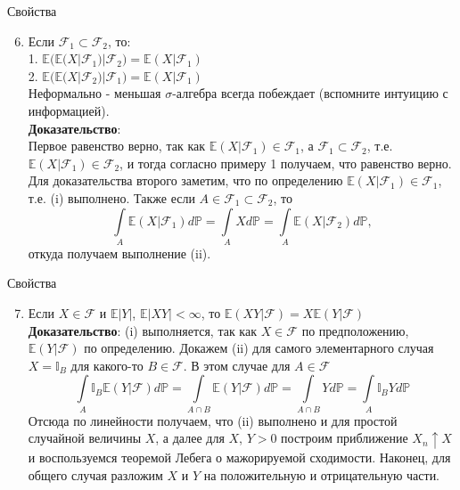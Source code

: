 \documentclass{beamer}%
\theoremstyle{definition}
\renewcommand{\P}{\mathbb{P}}
\newcommand{\F}{\mathcal{F}}
\begin{document}
\begin{frame}{Свойства}

\begin{enumerate}
\setcounter{enumi}{5}
\item Если $\F_1\subset\F_2$, то:
\\
1. $\mathbb{E}\big(\mathbb{E}(X|\F_1)|\F_2\big)=\mathbb{E}(X|\F_1)$
\\
2. $\mathbb{E}\big(\mathbb{E}(X|\F_2)|\F_1\big)=\mathbb{E}(X|\F_1)$
\\
Неформально - меньшая $\sigma$-алгебра всегда побеждает (вспомните интуицию с информацией).
\\
\textbf{Доказательство}:
\\
Первое равенство верно, так как $\mathbb{E}(X|\F_1)\in\F_1$, а $\F_1\subset\F_2$, т.е. $\mathbb{E}(X|\F_1)\in\F_2$, и тогда согласно примеру 1 получаем, что равенство верно.
\\
Для доказательства второго заметим, что по определению $\mathbb{E}(X|\F_1)\in\F_1$, т.е. (i) выполнено. Также если $A\in\F_1\subset\F_2$, то
$$\int\limits_A\mathbb{E}(X|\F_1)d\P=\int\limits_AXd\P=\int\limits_A\mathbb{E}(X|\F_2)d\P,$$
откуда получаем выполнение (ii).
\end{enumerate}

\end{frame}


\begin{frame}{Свойства}

\begin{enumerate}
\setcounter{enumi}{6}
\item Если $X\in\F$ и $\mathbb{E}|Y|$, $\mathbb{E}|XY|<\infty$, то $\mathbb{E}(XY|\F)=X\mathbb{E}(Y|\F)$
\\
\textbf{Доказательство}: (i) выполняется, так как $X\in\F$ по предположению, $\mathbb{E}(Y|\F)$ по определению. Докажем (ii) для самого элементарного случая $X=\mathbb{I}_B$ для какого-то $B\in\F$. В этом случае для $A\in\F$
$$\int\limits_A\mathbb{I}_B\mathbb{E}(Y|\F)d\P=\int\limits_{A\cap B}\mathbb{E}(Y|\F)d\P=\int\limits_{A\cap B}Yd\P=\int\limits_A\mathbb{I}_BYd\P$$
Отсюда по линейности получаем, что (ii) выполнено и для простой случайной величины $X$, а далее для $X$, $Y>0$ построим приближение $X_n\uparrow X$ и воспользуемся теоремой Лебега о мажорируемой сходимости. Наконец, для общего случая разложим $X$ и $Y$ на положительную и отрицательную части.
\end{enumerate}

\end{frame}
\end{document}
